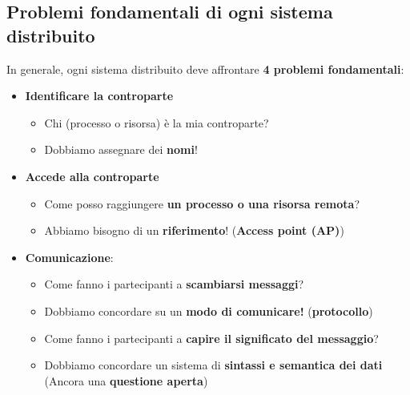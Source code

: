 \documentclass[12pt]{article}
\begin{document}
\subsection{Problemi fondamentali di ogni sistema distribuito}
In generale, ogni sistema distribuito deve affrontare \textbf{4 problemi fondamentali}:
\begin{itemize}
    \item \textbf{Identificare la controparte}
          \begin{itemize}
              \item Chi (processo o risorsa) è la mia controparte?
              \item Dobbiamo assegnare dei \textbf{nomi}!
          \end{itemize}
    \item \textbf{Accede alla controparte}
          \begin{itemize}
              \item Come posso raggiungere \textbf{un processo o una risorsa remota}?
              \item Abbiamo bisogno di un \textbf{riferimento}! (\textbf{Access point (AP)})
          \end{itemize}
    \item \textbf{Comunicazione}:
          \begin{itemize}
              \item Come fanno i partecipanti a \textbf{scambiarsi messaggi}?
              \item Dobbiamo concordare su un \textbf{modo di comunicare!} (\textbf{protocollo})
              \item Come fanno i partecipanti a \textbf{capire il significato del messaggio}?
              \item Dobbiamo concordare un sistema di \textbf{sintassi e semantica dei dati} (Ancora una \textbf{questione aperta})
          \end{itemize}
\end{itemize}
\end{document}
